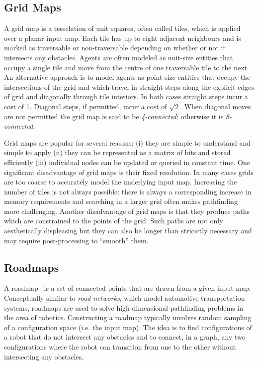 \subsection{Grid Maps}
\label{cha::lit::graphs::grid}
A grid map is a tesselation of unit squares, often called tiles, which is
applied over a planar input map. Each tile has up to eight adjacent neighbours
and is marked as traversable or non-traversable depending on whether or not it
intersects any obstacles.  Agents are often modeled as unit-size entities that
occupy a single tile and move from the centre of one traversable tile to the
next.  
An alternative approach is to model agents as point-size entities that occupy 
the intersections of the grid and which travel in straight steps along the
explicit edges of grid and diagonally through tile interiors.
In both cases straight steps incur a cost of 1. Diagonal steps, if permitted, 
incur a cost of $\sqrt{2}$.  When diagonal moves are not permitted the grid map 
is said to be \emph{4-connected}; otherwise it is \emph{8-connected}.  

Grid maps are popular for several reasons: (i) they are simple to understand 
and simple to apply (ii) they can be represented as a matrix of bits and stored
efficiently (iii) individual nodes can be updated or queried in constant time.
One significant disadvantage of grid maps is their fixed resolution. In many cases 
grids are too coarse to accurately model the underlying input map. Increasing the
number of tiles is not always possible: there is always a corresponding increase in
memory requirements and searching in a larger grid often makes pathfinding more 
challenging.
Another disadvantage of grid maps is that they produce paths which are
constrained to the points of the grid. Such paths are not only aesthetically
displeasing but they can also be longer than stricictly necessary and may
require post-processing to ``smooth'' them.

\subsection{Roadmaps}
\label{cha::lit::graphs::road}
A roadmap~\citep{kavraki94} is a set of connected points that are drawn from a given
input map. Conceptually similar to \emph{road networks}, which model automotive
transportation systems, roadmaps are used to solve high dimensional pathfinding 
problems in the area of robotics.
Constructing a roadmap typically involves random sampling of a configuration
space (i.e. the input map).
The idea is to find configurations of a robot that do not intersect any obstacles
and to connect, in a graph, any two configurations where the robot can transition
from one to the other without intersecting any obstacles.

